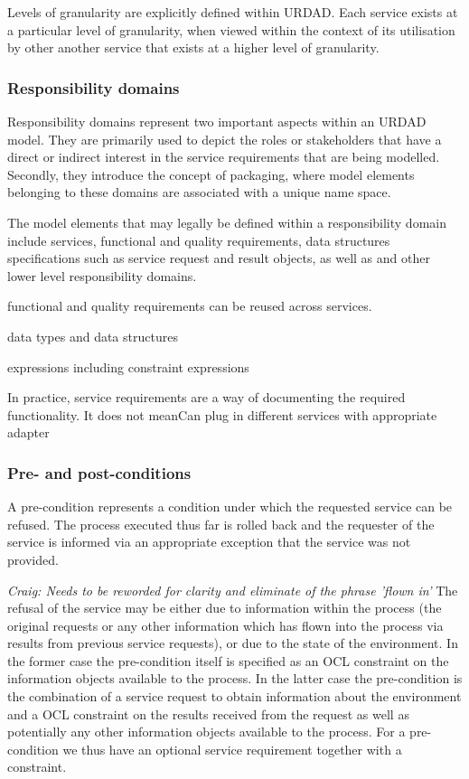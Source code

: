 
Levels of granularity are explicitly defined within URDAD. Each service exists at a particular level of granularity, when viewed within the context of its utilisation by other another service that exists at a higher level of granularity.

\subsubsection{Responsibility domains}

Responsibility domains represent two important aspects within an URDAD model. They are primarily used to depict the roles or stakeholders that have  a direct or indirect interest in the service requirements that are being modelled. Secondly, they introduce the concept of packaging, where model elements belonging to these domains are associated with a unique name space. 

The model elements that may legally be defined within a responsibility domain include services, functional and quality requirements, data structures specifications such as service request and result objects, as well as and other lower level responsibility domains.







functional and quality requirements can be reused across services. 

data types and data structures

expressions including constraint expressions

 In practice, service requirements are a way of documenting the required functionality. It does not meanCan plug in different services with appropriate adapter


\subsubsection{Pre- and post-conditions}

A pre-condition represents a condition under which the requested service can be refused. The process executed thus far is rolled back and the requester of the service is informed via an appropriate exception that the service was not provided. 

{\em Craig: Needs to be reworded for clarity and eliminate of the phrase 'flown in'}
The refusal of the service may be either due to information within the process (the original requests or any other information which has flown into the process via results from previous service requests), or due to the state of the environment. In the former case the pre-condition itself is specified as an OCL constraint on the information objects available to the process. In the latter case the pre-condition is the combination of a service request to obtain information about the environment and a OCL constraint on the results received from the request as well as potentially any other information objects available to the process. For a pre-condition we thus have an optional service requirement together with a constraint.


